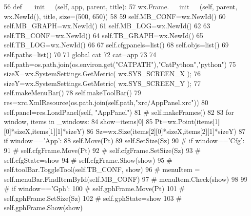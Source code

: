 \begin{DoxyCode}
56     \textcolor{keyword}{def }\hyperlink{classwrapper_1_1ModuleDictWrapper_a9a7a794150502f51df687831583e13b9}{\_\_init\_\_}(self, app, parent, title): 
57         wx.Frame.\_\_init\_\_(self, parent, wx.NewId(), title, size=(500, 650))
58         
59         self.MB\_CONF=wx.NewId()
60         self.MB\_GRAPH=wx.NewId()
61         self.MB\_LOG=wx.NewId()
62 
63         self.TB\_CONF=wx.NewId()
64         self.TB\_GRAPH=wx.NewId()
65         self.TB\_LOG=wx.NewId()
66 
67         self.cfgpanels=list()
68         self.objs=list()
69         self.paths=list()
70 
71         \textcolor{keyword}{global} cat
72         cat=app
73         
74         self.path=os.path.join(os.environ.get(\textcolor{stringliteral}{"CATPATH"}),\textcolor{stringliteral}{"CatPython"},\textcolor{stringliteral}{"python"})
75         sizeX=wx.SystemSettings.GetMetric( wx.SYS\_SCREEN\_X );
76         sizeY=wx.SystemSettings.GetMetric( wx.SYS\_SCREEN\_Y );
77         self.makeMenuBar()
78         self.makeToolBar()
79         res=xrc.XmlResource(os.path.join(self.path,\textcolor{stringliteral}{"xrc/AppPanel.xrc"}))
80         self.panel=res.LoadPanel(self, \textcolor{stringliteral}{"AppPanel"})
81 \textcolor{comment}{#        self.makeFrames()}
82         
83         \textcolor{keywordflow}{for} window, items \textcolor{keywordflow}{in} \_windows:
84             show=items[0]
85             Pt=wx.Point(items[1][0]*sizeX,items[1][1]*sizeY)
86             Sz=wx.Size(items[2][0]*sizeX,items[2][1]*sizeY)
87             \textcolor{keywordflow}{if} window==\textcolor{stringliteral}{'App'}:
88                 self.Move(Pt)
89                 self.SetSize(Sz)
90             \textcolor{comment}{# if window=='Cfg':}
91             \textcolor{comment}{#     self.cfgFrame.Move(Pt)}
92             \textcolor{comment}{#     self.cfgFrame.SetSize(Sz)}
93             \textcolor{comment}{#     self.cfgState=show}
94             \textcolor{comment}{#     self.cfgFrame.Show(show)}
95             \textcolor{comment}{#     self.toolBar.ToggleTool(self.TB\_CONF, show)}
96             \textcolor{comment}{#     menuItem = self.menuBar.FindItemById(self.MB\_CONF)}
97             \textcolor{comment}{#     menuItem.Check(show) }
98                 
99             \textcolor{comment}{# if window=='Gph':}
100             \textcolor{comment}{#     self.gphFrame.Move(Pt)}
101             \textcolor{comment}{#     self.gphFrame.SetSize(Sz)}
102             \textcolor{comment}{#     self.gphState=show}
103             \textcolor{comment}{#     self.gphFrame.Show(show)}

\end{DoxyCode}

